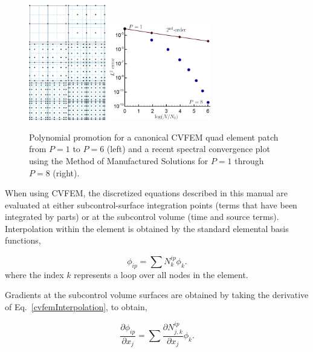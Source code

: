 \begin{figure}[h!tp]
\centering
\includegraphics[clip,width=0.3\textwidth]{images/cvfem_nodes.png}
\includegraphics[clip,width=0.4\textwidth]{images/cvfem_conv.png}
\caption{Polynomial promotion for a canonical CVFEM quad element patch from $P=1$ to $P=6$ (left) and a recent spectral convergence plot using the 
Method of Manufactured Solutions for $P=1$ through $P=8$ (right).}
\label{hoCVFEM}
\end{figure}

When using CVFEM, the discretized equations described in this manual
are evaluated at either subcontrol-surface integration points (terms that
have been integrated by parts) or at the subcontrol volume (time and
source terms). Interpolation within the element is obtained by the
standard elemental basis functions,

\begin{equation}
\phi_{ip} = \sum N^{ip}_k \phi_k.
\label{cvfemInterpolation}
\end{equation}
%
where the index $k$ represents a loop over all nodes in the element.

Gradients at the subcontrol volume surfaces are obtained by taking the derivative
of Eq.~\ref{cvfemInterpolation}, to obtain,

\begin{equation}
\frac{\partial \phi_{ip}}{\partial x_j} = \sum \frac{\partial N^{ip}_{j,k}} {\partial x_j} \phi_k.
\label{cvfemDerivative}
\end{equation}

